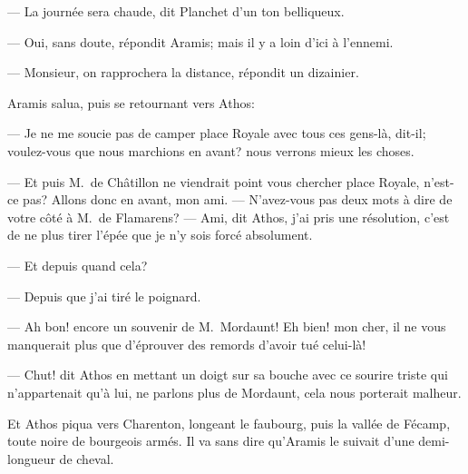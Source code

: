 — La journée sera chaude, dit Planchet d'un ton belliqueux.

— Oui, sans doute, répondit Aramis; mais il y a loin d'ici à l'ennemi.

— Monsieur, on rapprochera la distance, répondit un dizainier.

Aramis salua, puis se retournant vers Athos:

— Je ne me soucie pas de camper place Royale avec tous ces gens-là, dit-il; voulez-vous que nous marchions en avant? nous verrons mieux les choses.

— Et puis M.~de Châtillon ne viendrait point vous chercher place Royale, n'est-ce pas? Allons donc en avant, mon ami.
— N'avez-vous pas deux mots à dire de votre côté à M.~de Flamarens?
— Ami, dit Athos, j'ai pris une résolution, c'est de ne plus tirer l'épée que je n'y sois forcé absolument.

— Et depuis quand cela?

— Depuis que j'ai tiré le poignard.

— Ah bon! encore un souvenir de M.~Mordaunt! Eh bien! mon cher, il ne vous manquerait plus que d'éprouver des remords d'avoir tué celui-là!

— Chut! dit Athos en mettant un doigt sur sa bouche avec ce sourire triste qui n'appartenait qu'à lui, ne parlons plus de Mordaunt, cela nous porterait malheur.

Et Athos piqua vers Charenton, longeant le faubourg, puis la vallée de Fécamp, toute noire de bourgeois armés. Il va sans dire qu'Aramis le suivait d'une demi-longueur de cheval.